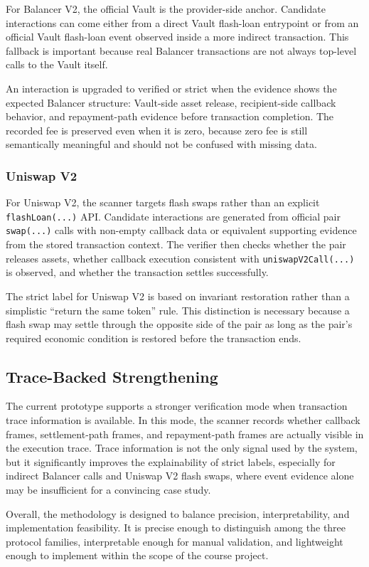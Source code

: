 For Balancer V2, the official Vault is the provider-side anchor. Candidate interactions can come either from a direct Vault flash-loan entrypoint or from an official Vault flash-loan event observed inside a more indirect transaction. This fallback is important because real Balancer transactions are not always top-level calls to the Vault itself.

An interaction is upgraded to verified or strict when the evidence shows the expected Balancer structure: Vault-side asset release, recipient-side callback behavior, and repayment-path evidence before transaction completion. The recorded fee is preserved even when it is zero, because zero fee is still semantically meaningful and should not be confused with missing data.

\subsubsection{Uniswap V2}

For Uniswap V2, the scanner targets flash swaps rather than an explicit \texttt{flashLoan(...)} API. Candidate interactions are generated from official pair \texttt{swap(...)} calls with non-empty callback data or equivalent supporting evidence from the stored transaction context. The verifier then checks whether the pair releases assets, whether callback execution consistent with \texttt{uniswapV2Call(...)} is observed, and whether the transaction settles successfully.

The strict label for Uniswap V2 is based on invariant restoration rather than a simplistic ``return the same token'' rule. This distinction is necessary because a flash swap may settle through the opposite side of the pair as long as the pair's required economic condition is restored before the transaction ends.

\subsection{Trace-Backed Strengthening}

The current prototype supports a stronger verification mode when transaction trace information is available. In this mode, the scanner records whether callback frames, settlement-path frames, and repayment-path frames are actually visible in the execution trace. Trace information is not the only signal used by the system, but it significantly improves the explainability of strict labels, especially for indirect Balancer calls and Uniswap V2 flash swaps, where event evidence alone may be insufficient for a convincing case study.

Overall, the methodology is designed to balance precision, interpretability, and implementation feasibility. It is precise enough to distinguish among the three protocol families, interpretable enough for manual validation, and lightweight enough to implement within the scope of the course project.

